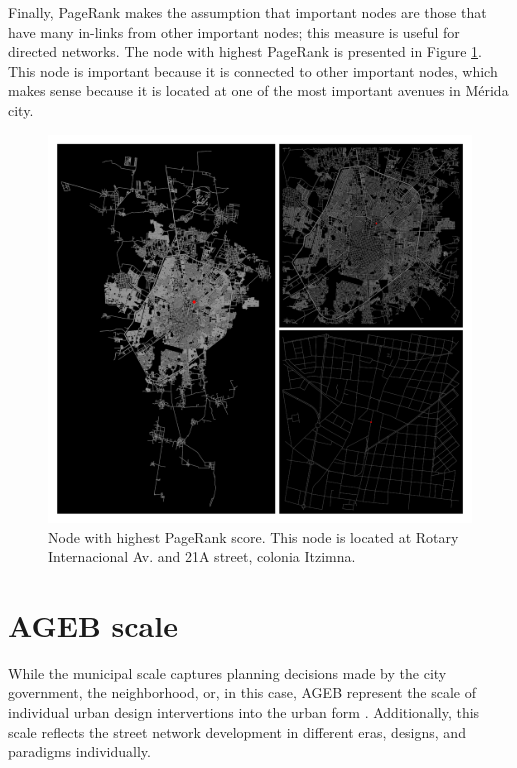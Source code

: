 Finally, PageRank makes the assumption that important nodes are those that have many in-links from other important nodes; this measure is useful for directed networks. The node with highest PageRank is presented in Figure \ref{fig:merida-max-node-pagerank}. This node is important because it is connected to other important nodes, which makes sense because it is located at one of the most important avenues in Mérida city.

\begin{figure}[htpb]
  \centering
  \includegraphics[width=1.0\textwidth]{Figures/merida-node-pagerank.png}
  \caption{Node with highest PageRank score. This node is located at Rotary Internacional Av. and 21A street, colonia Itzimna.
    \label{fig:merida-max-node-pagerank}}
\end{figure}

\section{AGEB scale}
\label{sec:ageb-scale}

While the municipal scale captures planning decisions made by the city government, the neighborhood, or, in this case, AGEB represent the scale of individual urban design intervertions into the urban form \cite{boeing_multi-scale_2018}. Additionally, this scale reflects the street network development in different eras, designs, and paradigms individually.

